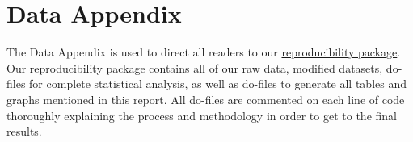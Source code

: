 \documentclass[12pt]{article}
\begin{document}
\newpage
\section*{Data Appendix} \label{sec:appendixa}

The Data Appendix is used to direct all readers to our \href{https://github.com/ecn310/course-project-taxes-tariffs/blob/main/Reproducibility_Package/Reproducibility_Package.md}{reproducibility package}. Our reproducibility package contains all of our raw data, modified datasets, do-files for complete statistical analysis, as well as do-files to generate all tables and graphs mentioned in this report. All do-files are commented on each line of code thoroughly explaining the process and methodology in order to get to the final results. 
\end{document}

